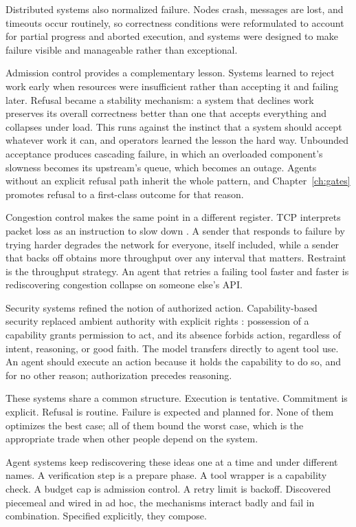 \documentclass[11pt]{book}
\begin{document}
Distributed systems also normalized failure. Nodes crash, messages are lost, and timeouts occur routinely, so correctness conditions were reformulated to account for partial progress and aborted execution, and systems were designed to make failure visible and manageable rather than exceptional.

Admission control provides a complementary lesson. Systems learned to reject work early when resources were insufficient rather than accepting it and failing later. Refusal became a stability mechanism: a system that declines work preserves its overall correctness better than one that accepts everything and collapses under load. This runs against the instinct that a system should accept whatever work it can, and operators learned the lesson the hard way. Unbounded acceptance produces cascading failure, in which an overloaded component's slowness becomes its upstream's queue, which becomes an outage. Agents without an explicit refusal path inherit the whole pattern, and Chapter~\ref{ch:gates} promotes refusal to a first-class outcome for that reason.

Congestion control makes the same point in a different register. TCP interprets packet loss as an instruction to slow down \cite{jacobson1988congestion}. A sender that responds to failure by trying harder degrades the network for everyone, itself included, while a sender that backs off obtains more throughput over any interval that matters. Restraint is the throughput strategy. An agent that retries a failing tool faster and faster is rediscovering congestion collapse on someone else's API.

Security systems refined the notion of authorized action. Capability-based security replaced ambient authority with explicit rights \cite{saltzer1975protection}: possession of a capability grants permission to act, and its absence forbids action, regardless of intent, reasoning, or good faith. The model transfers directly to agent tool use. An agent should execute an action because it holds the capability to do so, and for no other reason; authorization precedes reasoning.

These systems share a common structure. Execution is tentative. Commitment is explicit. Refusal is routine. Failure is expected and planned for. None of them optimizes the best case; all of them bound the worst case, which is the appropriate trade when other people depend on the system.

Agent systems keep rediscovering these ideas one at a time and under different names. A verification step is a prepare phase. A tool wrapper is a capability check. A budget cap is admission control. A retry limit is backoff. Discovered piecemeal and wired in ad hoc, the mechanisms interact badly and fail in combination. Specified explicitly, they compose.
\end{document}
